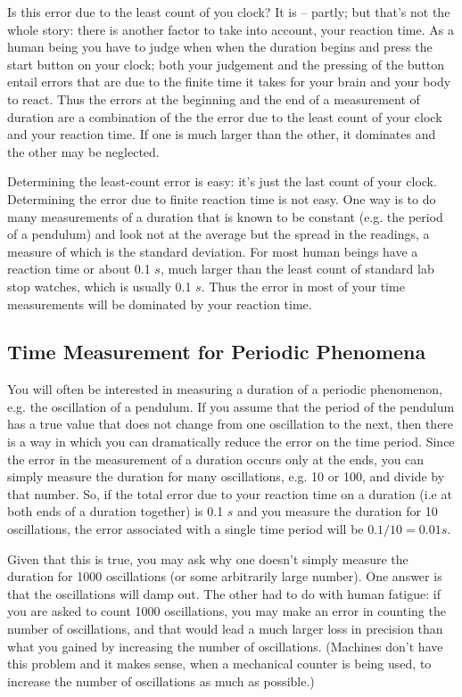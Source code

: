 Is this error due to the least count of you clock? It is -- partly; but that's not the whole story: there is another factor to take into account, your reaction time. As a human being you have to judge when when the duration begins and press the start button on your clock; both your judgement and the pressing of the button entail errors that are due to the finite time it takes for your brain and your body to react. Thus the errors at the beginning and the end of a measurement of duration are a combination of the the error due to the least count of your clock and your reaction time. If one is much larger than the other, it dominates and the other may be neglected. 

Determining the least-count error is easy: it's just the last count of your clock. Determining the error due to finite reaction time is not easy. One way is to do many measurements of a duration that is known to be constant (e.g. the period of a pendulum) and look not at the average but the spread in the readings, a measure of which is the standard deviation. For most human beings have a reaction time or about 0.1 $s$, much larger than the least count of standard lab stop watches, which is usually 0.1 $s$. Thus the error in most of your time measurements will be dominated by your reaction time. 

\subsection{Time Measurement for Periodic Phenomena}

You will often be interested in measuring a duration of a periodic phenomenon, e.g. the oscillation of a pendulum. If you assume that the period of the pendulum has a true value that does not change from one oscillation to the next, then there is a way in which you can dramatically reduce the error on the time period. Since the error in the measurement of a duration occurs only at the ends, you can simply measure the duration for many oscillations, e.g. 10 or 100, and divide by that number. So, if the total error due to your reaction time on a duration (i.e at both ends of a duration together) is 0.1 $s$ and you measure the duration for 10 oscillations, the error associated with a single time period will be $0.1/10 = 0.01 s$.

Given that this is true, you may ask why one doesn't simply measure the duration for 1000 oscillations (or some arbitrarily large number). One answer is that the oscillations will damp out. The other had to do with human fatigue: if you are asked to count 1000 oscillations, you may make an error in counting the number of oscillations, and that would lead a much larger loss in precision than what you gained by increasing the number of oscillations. (Machines don't have this problem and it makes sense, when a mechanical counter is being used, to increase the number of oscillations as much as possible.) 

